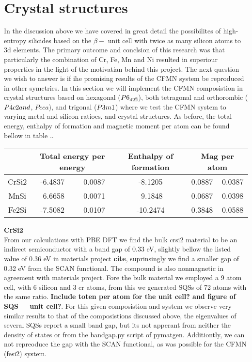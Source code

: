 \section{Crystal structures}

In the discussion above we have covered in great detail the possibilites of high-entropy silicides based on the $\beta-$  unit cell with twice as many silicon atoms to 3d elements. The primary outcome and conclsion of this research was that particularly the combination of Cr, Fe, Mn and Ni resulted in superiour properties in the light of the motivatian behind this project. The next question we wish to answer is if ihe promising results of the CFMN system be reproduced in other symetries. In this section we will implement the CFMN composistion in crystal structures based on hexagonal  ($P6_{42\Bar{2}}$), both tetragonal and orthorombic  ($P\Bar{4}c2 and$, $Pcca$), and trigonal  ($P\Bar{3}m1$) where we test the CFMN system to varying metal and silicon ratioes, and crystal structures. As before, the total energy, enthalpy of formation and magnetic moment per atom can be found bellow in table ..
\begin{table}[h!]
\begin{tabular}{@{}cccccc@{}}
\toprule
            & \multicolumn{2}{c}{Total energy per energy} & Enthalpy of formation & \multicolumn{2}{c}{Mag per atom} \\ \midrule
CrSi2       & -6.4837               & 0.0087              & -8.1205             & 0.0887          & 0.0387         \\
MnSi        & -6.6658               & 0.0071              & -9.1848             & 0.0687          & 0.0398         \\
Fe2Si       & -7.5082               & 0.0107              & -10.2474            & 0.3848          & 0.0588         \\ \bottomrule
\end{tabular}
\end{table}

\textbf{CrSi2 \\}
From our calculations with PBE DFT we find the bulk crsi2 material to be an indirect semiconductor with a band gap of 0.33 eV, slightly bellow the listed value of 0.36 eV in materials project \textbf{cite}, suprinsingly we find a smaller gap of 0.32 eV from the SCAN functional. The compound is also nonmagnetic in agreement with materials project. Fore the bulk material we employed a 9 atom cell, with 6 silicon and 3 cr atoms, from this we generated SQSs of 72 atoms with the same ratio.  \textbf{Include toten per atom for the unit cell? and figure of SQS + unit cell?}. For this given composistion and system we observe very similar results to that of the composistions discussed above, the eigenvalues of several SQSs report a small band gap, but its not apperant from neither the density of states or from the bandgap.py script of pymatgen. Additiontly, we can not repreoduce the gap with the SCAN functional, as was possible for the CFMN (fesi2) system.   

